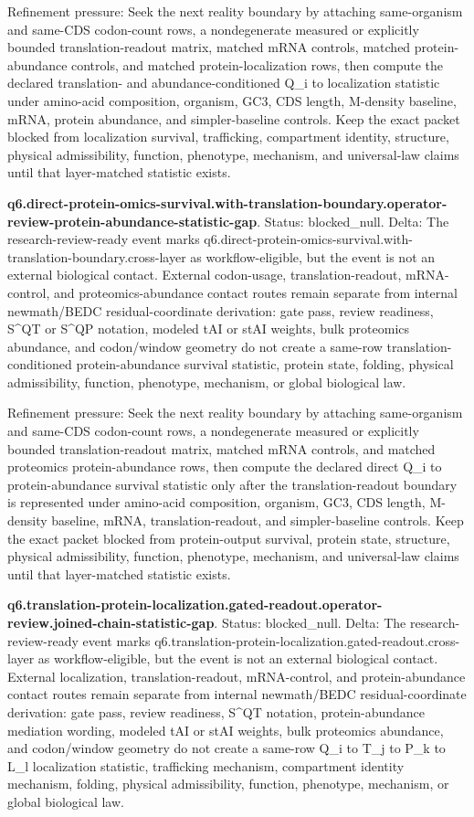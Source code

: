 Refinement pressure: Seek the next reality boundary by attaching same-organism and same-CDS codon-count rows, a nondegenerate measured or explicitly bounded translation-readout matrix, matched mRNA controls, matched protein-abundance controls, and matched protein-localization rows, then compute the declared translation- and abundance-conditioned Q\_i to localization statistic under amino-acid composition, organism, GC3, CDS length, M-density baseline, mRNA, protein abundance, and simpler-baseline controls. Keep the exact packet blocked from localization survival, trafficking, compartment identity, structure, physical admissibility, function, phenotype, mechanism, and universal-law claims until that layer-matched statistic exists.

\textbf{q6.direct-protein-omics-survival.with-translation-boundary.operator-review-protein-abundance-statistic-gap}. Status: blocked\_null. Delta: The research-review-ready event marks q6.direct-protein-omics-survival.with-translation-boundary.cross-layer as workflow-eligible, but the event is not an external biological contact. External codon-usage, translation-readout, mRNA-control, and proteomics-abundance contact routes remain separate from internal newmath/BEDC residual-coordinate derivation: gate pass, review readiness, S\textasciicircum{}QT or S\textasciicircum{}QP notation, modeled tAI or stAI weights, bulk proteomics abundance, and codon/window geometry do not create a same-row translation-conditioned protein-abundance survival statistic, protein state, folding, physical admissibility, function, phenotype, mechanism, or global biological law.

Refinement pressure: Seek the next reality boundary by attaching same-organism and same-CDS codon-count rows, a nondegenerate measured or explicitly bounded translation-readout matrix, matched mRNA controls, and matched proteomics protein-abundance rows, then compute the declared direct Q\_i to protein-abundance survival statistic only after the translation-readout boundary is represented under amino-acid composition, organism, GC3, CDS length, M-density baseline, mRNA, translation-readout, and simpler-baseline controls. Keep the exact packet blocked from protein-output survival, protein state, structure, physical admissibility, function, phenotype, mechanism, and universal-law claims until that layer-matched statistic exists.

\textbf{q6.translation-protein-localization.gated-readout.operator-review.joined-chain-statistic-gap}. Status: blocked\_null. Delta: The research-review-ready event marks q6.translation-protein-localization.gated-readout.cross-layer as workflow-eligible, but the event is not an external biological contact. External localization, translation-readout, mRNA-control, and protein-abundance contact routes remain separate from internal newmath/BEDC residual-coordinate derivation: gate pass, review readiness, S\textasciicircum{}QT notation, protein-abundance mediation wording, modeled tAI or stAI weights, bulk proteomics abundance, and codon/window geometry do not create a same-row Q\_i to T\_j to P\_k to L\_l localization statistic, trafficking mechanism, compartment identity mechanism, folding, physical admissibility, function, phenotype, mechanism, or global biological law.

